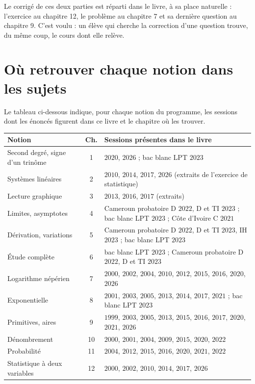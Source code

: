 \begin{notepourlaclasse}
Le corrigé de ces deux parties est réparti dans le livre, à sa place
naturelle : l'exercice au chapitre 12, le problème au chapitre 7 et sa
dernière question au chapitre 9. C'est voulu : un élève qui cherche la
correction d'une question trouve, du même coup, le cours dont elle relève.
\end{notepourlaclasse}

\section{Où retrouver chaque notion dans les sujets}

Le tableau ci-dessous indique, pour chaque notion du programme, les sessions
dont les énoncés figurent dans ce livre et le chapitre où les trouver.

\begin{center}\footnotesize
\renewcommand{\arraystretch}{1.4}
\begin{tabular}{|L{4.1cm}|c|L{6.1cm}|}
\hline
\textbf{Notion} & \textbf{Ch.} & \textbf{Sessions présentes dans le livre}\\
\hline
Second degré, signe d'un trinôme & 1 & $2020$, $2026$ ; bac blanc LPT
$2023$\\
Systèmes linéaires & 2 & $2010$, $2014$, $2017$, $2026$ (extraits de
l'exercice de statistique)\\
Lecture graphique & 3 & $2013$, $2016$, $2017$ (extraits)\\
Limites, asymptotes & 4 & Cameroun probatoire D $2022$, D et TI $2023$ ;
bac blanc LPT $2023$ ; Côte d'Ivoire C $2021$\\
Dérivation, variations & 5 & Cameroun probatoire D $2022$, D et TI $2023$,
IH $2023$ ; bac blanc LPT $2023$\\
Étude complète & 6 & bac blanc LPT $2023$ ; Cameroun probatoire D $2022$,
D et TI $2023$\\
Logarithme népérien & 7 & $2000$, $2002$, $2004$, $2010$, $2012$, $2015$,
$2016$, $2020$, $2026$\\
Exponentielle & 8 & $2001$, $2003$, $2005$, $2013$, $2014$, $2017$,
$2021$ ; bac blanc LPT $2023$\\
Primitives, aires & 9 & $1999$, $2003$, $2005$, $2013$, $2015$,
$2016$, $2017$, $2020$, $2021$, $2026$\\
Dénombrement & 10 & $2000$, $2001$, $2004$, $2009$, $2015$, $2020$,
$2022$\\
Probabilité & 11 & $2004$, $2012$, $2015$, $2016$, $2020$, $2021$,
$2022$\\
Statistique à deux variables & 12 & $2000$, $2002$, $2010$, $2014$,
$2017$, $2026$\\
\hline
\end{tabular}
\end{center}

